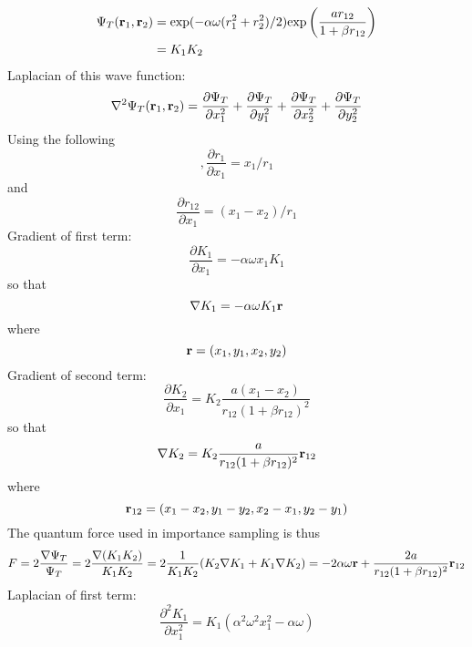 \documentclass[english, a4paper]{article}
\begin{document}
\begin{align}
 \Psi_T({\bf r}_1, {\bf r}_2) &= \textrm{exp}(-\alpha \omega(r_1^2 + r_2^2)/2)
 \textrm{exp}\left(\frac{a r_{12}}{1 + \beta r_{12}}\right) \\
 &= K_1K_2
\end{align}
Laplacian of this wave function:
\begin{equation}
 \nabla^2 \Psi_T({\bf r}_1, {\bf r}_2) = \frac{\partial \Psi_T}{\partial x_1^2} + 
 \frac{\partial \Psi_T}{\partial y_1^2} + \frac{\partial \Psi_T}{\partial x_2^2} +
 \frac{\partial \Psi_T}{\partial y_2^2}
\end{equation}
Using the following
\begin{equation},
 \frac{\partial r_1}{\partial x_1} = x_1/r_1
\end{equation}
and 
\begin{equation}
 \frac{\partial r_{12}}{\partial x_1} = (x_1 - x_2)/r_1
\end{equation}
Gradient of first term:
\begin{equation}
 \frac{\partial K_1}{\partial x_1} = -\alpha \omega x_1 K_1
\end{equation}
so that
\begin{equation}
 \nabla K_1 = -\alpha\omega K_1 {\bf r}
\end{equation}
where
\begin{equation}
 {\bf r} = (x_1, y_1, x_2, y_2)
\end{equation}
Gradient of second term:
\begin{equation}
 \frac{\partial K_2}{\partial x_1} = K_2 \frac{a(x_1 - x_2)}{r_{12}(1 + \beta r_{12})^2}
\end{equation}
so that
\begin{equation}
 \nabla K_2 = 
 K_2 \frac{a}{r_{12}(1 + \beta r_{12})^2} {\bf r}_{12}
\end{equation}
where
\begin{equation}
 {\bf r}_{12} = (x_1 - x_2, y_1 - y_2, x_2 - x_1, y_2 - y_1) 
\end{equation}
The quantum force used in importance sampling is thus
\begin{align}
 F = 2\frac{\nabla \Psi_T}{\Psi_T} = 2\frac{\nabla(K_1K_2)}{K_1K_2} = 
 2\frac{1}{K_1K_2}(K_2 \nabla K_1 + K_1 \nabla K_2) = 
 -2\alpha\omega {\bf r} + \frac{2a}{r_{12}(1 + \beta r_{12})^2} {\bf r}_{12}
\end{align}
Laplacian of first term:
\begin{equation}
 \frac{\partial^2 K_1}{\partial x_1^2} = K_1 (\alpha^2 \omega^2 x_1^2 -\alpha \omega )  
\end{equation}
\end{document}
